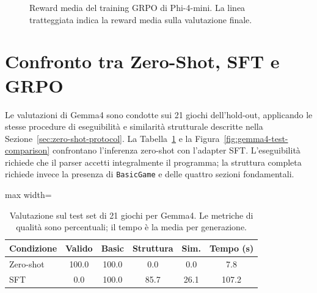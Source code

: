 \documentclass[final,5p,times,twocolumn]{elsarticle}
\begin{document}
\begin{figure}[t]
  \centering
  \caption{Reward media del training GRPO di Phi-4-mini. La linea tratteggiata indica la reward media sulla valutazione finale.}
  \label{fig:phi4-grpo-reward}
\end{figure}

\section{Confronto tra Zero-Shot, SFT e GRPO}

Le valutazioni di Gemma4 sono condotte sui 21 giochi dell'hold-out, applicando le stesse procedure di eseguibilità e similarità strutturale descritte nella Sezione~\ref{sec:zero-shot-protocol}. La Tabella~\ref{tab:gemma4-test-comparison} e la Figura~\ref{fig:gemma4-test-comparison} confrontano l'inferenza zero-shot con l'adapter SFT. L'eseguibilità richiede che il parser accetti integralmente il programma; la struttura completa richiede invece la presenza di \texttt{BasicGame} e delle quattro sezioni fondamentali.

\begin{table}[t]
  \centering
  \small
  \caption{Valutazione sul test set di 21 giochi per Gemma4. Le metriche di qualità sono percentuali; il tempo è la media per generazione.}
  \label{tab:gemma4-test-comparison}
  \begin{adjustbox}{max width=\columnwidth}
  \begin{tabular}{lccccc}
    \toprule
    Condizione & Valido & Basic & Struttura & Sim. & Tempo (s) \\
    \midrule
    Zero-shot & 100.0 & 100.0 & 0.0 & 0.0 & 7.8 \\
    SFT & 0.0 & 100.0 & 85.7 & 26.1 & 107.2 \\
    \bottomrule
  \end{tabular}
  \end{adjustbox}
\end{table}
\end{document}
